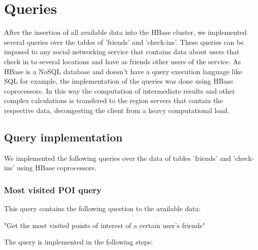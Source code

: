 \chapter{Queries}

After the insertion of all available data into the HBase cluster, we implemented several queries over the tables of 'friends' and 'check-ins'. 
These queries can be imposed to any 
social networking service that contains data about users that check in to several locations and have as friends other users of the service. 
As HBase is a NoSQL database and doesn't have a query execution language like SQL for example, 
the implementation of the queries was done using HBase coprocessors. In this way the computation of intermediate results and other complex calculations is 
transfered to the region servers that contain the respective data, decongesting the client from a heavy computational load.

\section{Query implementation}

We implemented the following queries over the data of tables 'friends' and 'check-ins' using HBase coprocessors. 

\subsection{Most visited POI query}

This query contains the following question to the available data:
\begin{center}
 "Get the most visited points of interest of a certain user's friends"
\end{center}

The query is implemented in the following steps:

